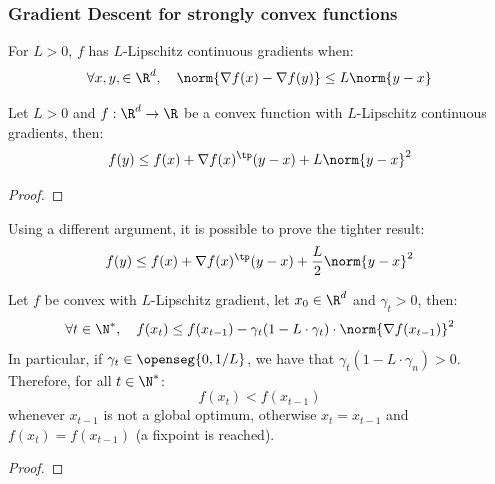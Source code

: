 \documentclass[toc, titlepaged]{../cs-classes/cs-classes}
\begin{document}
\subsubsection{Gradient Descent for strongly convex functions}
\begin{definition}
    For $L>0$, $f$ has $L$-Lipschitz continuous gradients when:
    \begin{equation*}
        \forall x, y, \in\R^d, \quad \norm{\nabla f(x) - \nabla f(y)}\leq L\norm{y-x}
    \end{equation*}
\end{definition}

\begin{lemma}
    Let $L>0$ and $f:\R^d\to\R$ be a convex function with $L$-Lipschitz continuous gradients, then:
    \begin{equation}
        f(y)\leq f(x)+\nabla f(x)^\tp(y-x)+L\norm{y-x}^2
    \end{equation}
\end{lemma}
\begin{proof}
\end{proof}

\begin{remark}
    Using a different argument, it is possible to prove the tighter result:
    \begin{equation}
        \label{eq:tighter-ineq}
        f(y)\leq f(x)+\nabla f(x)^\tp(y-x)+\frac{L}{2}\norm{y-x}^2
    \end{equation}
\end{remark}

\begin{lemma}
    Let $f$ be convex with $L$-Lipschitz gradient, let $x_0\in\R^d$ and $\gamma_t>0$, then:
    \begin{equation*}
        \forall t\in\N^*, \quad f(x_t)\leq f(x_{t-1}) - \gamma_t(1-L\cdot\gamma_t) \cdot \norm{\nabla f(x_{t-1})}^2
    \end{equation*}
    In particular, if $\gamma_t\in\openseg{0, 1/L}$, we have that $\gamma_t(1-L\cdot\gamma_n)>0$. Therefore, for all $t\in\N^*$:
    \begin{equation*}
        f(x_t)<f(x_{t-1})
    \end{equation*}
    whenever $x_{t-1}$ is not a global optimum, otherwise $x_t=x_{t-1}$ and $f(x_t)=f(x_{t-1})$ (a fixpoint is reached).
\end{lemma}
\begin{proof}
\end{proof}
\end{document}
